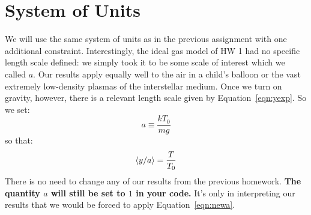 \documentclass[12pt]{article}
\begin{document}
\section{System of Units}

We will use the same system of units as in the previous assignment
with one additional constraint.  Interestingly, the ideal gas model of
HW 1 had no specific length scale defined: we simply took it to be
some scale of interest which we called $a$.  Our results apply equally
well to the air in a child's balloon or the vast extremely low-density
plasmas of the interstellar medium.  Once we turn on gravity, however,
there is a relevant length scale given by Equation~\ref{eqn:yexp}.  So
we set:
\begin{equation}
 \label{eqn:newa}
a \equiv \frac{k T_0}{m g}
\end{equation}
so that:
\begin{equation}
  \label{eqn:expy}
  \braket{y/a} = \frac{T}{T_0}
\end{equation}
There is no need to change any of our results from the previous
homework.  {\bf The quantity $a$ will still be set to $1$ in your
  code.}  It's only in interpreting our results that we would be
forced to apply Equation~\ref{eqn:newa}.
\end{document}
